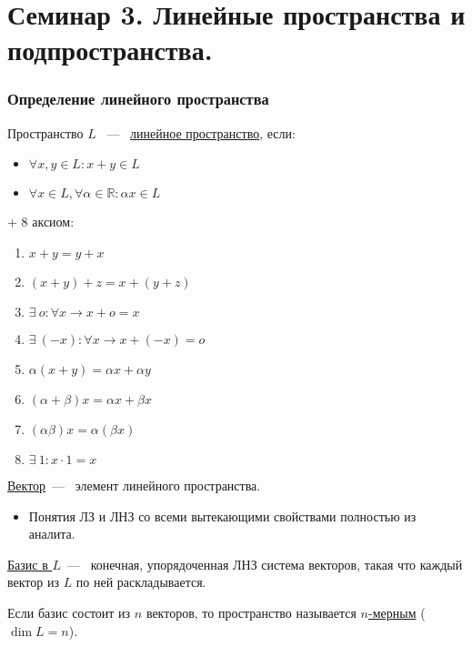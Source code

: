 \part{Семинар 3. Линейные пространства и подпространства.}
\section{Определение линейного пространства}
\begin{definition} %
	Пространство $L$ ~---~ \underline{линейное пространство}, если:
	\begin{itemize}
		\item $\forall x, y \in L: x + y \in L$
		\item $\forall x \in L, \forall \alpha \in \mathbb{R} : \alpha x \in L$
	\end{itemize}
	
	+ 8 аксиом:
	\begin{enumerate}
		\item $x + y = y+x$
		\item $(x+y) +z=x +(y+z)$
		\item $\exists\ o : \forall x \rightarrow x+o=x$
		\item $\exists\ (-x):\forall x \rightarrow  x+(-x) = o$
		\item $\alpha(x+y) = \alpha x+\alpha y$
		\item $(\alpha +\beta)x = \alpha x+\beta x$
		\item $(\alpha\beta) x=\alpha(\beta x)$
		\item $\exists\ 1: x\cdot 1= x$
	\end{enumerate}
\end{definition} 
\underline{Вектор}~---~ элемент линейного пространства.

\begin{itemize}
	\item Понятия ЛЗ и ЛНЗ со всеми вытекающими свойствами полностью из аналита.
\end{itemize}

\begin{definition}
	\underline{Базис в $L$}~---~ конечная, упорядоченная ЛНЗ система векторов, такая что каждый вектор из $L$ по ней раскладывается.
\end{definition}
Если базис состоит из $n$ векторов, то пространство называется \underline{$n$-мерным} ($\dim L = n$). %
\vspace{3mm}

